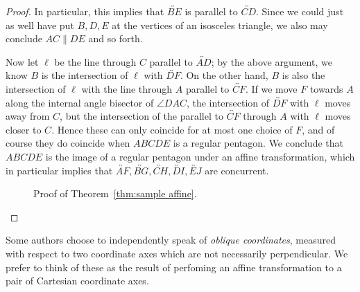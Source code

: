 \documentclass[12pt]{book}
\numberwithin{exc}{section}
\numberwithin{figure}{section}
\numberwithin{equation}{theorem}
\def\ang{\angle}
\def\line#1{\overleftrightarrow{#1}}
\begin{document}
\begin{proof}
In particular, this implies that $\line{BE}$ is parallel to $\line{CD}$. Since we 
could just as well have put $B, D, E$ at the vertices of an isosceles 
triangle, we also may conclude $AC \parallel DE$ and so forth.

Now let $\ell$ be the line through 
$C$ parallel to $\line{AD}$; by the above argument, we know $B$ is the 
intersection of $\ell$ with $\line{DF}$. On the other hand, $B$ is also the 
intersection of $\ell$ with the line through $A$ parallel to $\line{CF}$. If 
we move $F$ towards $A$ along the internal angle bisector of $\ang DAC$,
the intersection of $\line{DF}$ with $\ell$ moves away from $C$, but the 
intersection of the parallel to $\line{CF}$ through $A$ with $\ell$ moves 
closer to $C$. Hence these can only coincide for at most one choice 
of $F$, and of course they do coincide when $ABCDE$ is a regular pentagon. 
We conclude that $ABCDE$ is the image of a regular pentagon under an 
affine transformation, which in particular implies that $\line{AF}, \line{BG}, 
\line{CH}, \line{DI}, \line{EJ}$ are concurrent.
\begin{figure}[ht]
\caption{Proof of Theorem~\ref{thm:sample affine}.}
\end{figure}
\end{proof}

Some authors choose to independently speak of  \emph{oblique
coordinates},  
measured with respect to two coordinate axes which are not necessarily perpendicular. We prefer to think of these as the result of perfoming an affine transformation to a pair of Cartesian coordinate axes.
\end{document}
